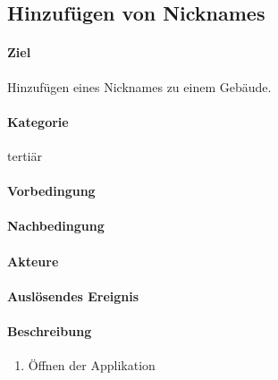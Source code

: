 \subsection{Hinzufügen von Nicknames}
\label{Hinzufügen von Nicknames}
\paragraph{Ziel}
Hinzufügen eines Nicknames zu einem Gebäude.
\paragraph{Kategorie}
tertiär
\paragraph{Vorbedingung}

\paragraph{Nachbedingung}

\paragraph{Akteure}

\paragraph{Auslösendes Ereignis}

\paragraph{Beschreibung}
\begin{enumerate}
    \item Öffnen der Applikation
\end{enumerate}